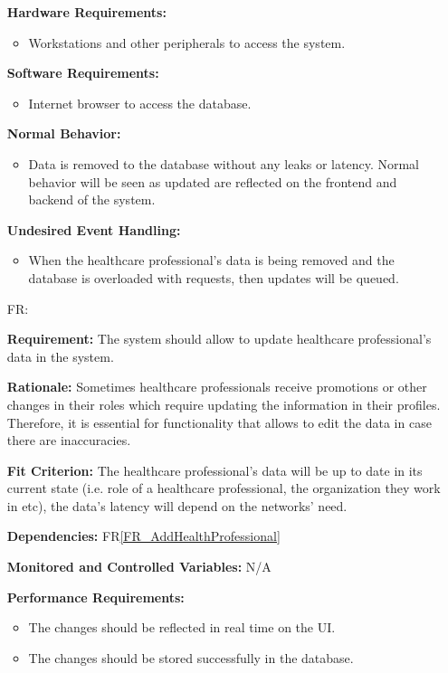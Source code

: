 \documentclass[12pt]{article}
\newcounter{reqnum} %
\begin{document}
\begin{itemize}
\textbf{Hardware Requirements:}
\begin{itemize}
  \item Workstations and other peripherals to access the system.
\end{itemize} 

\textbf{Software Requirements:}
\begin{itemize}
  \item Internet browser to access the database.
\end{itemize} 

\textbf{Normal Behavior:}
\begin{itemize}
  \item Data is removed to the database without any leaks or latency. Normal behavior will be seen as updated are reflected on the frontend and backend of the system.
\end{itemize} 

\textbf{Undesired Event Handling:}
\begin{itemize}
  \item When the healthcare professional’s data is being removed and the database is overloaded with requests, then updates will be queued.
\end{itemize} 

\item[FR\refstepcounter{reqnum}\thereqnum \label{FR_UpdateHealthProfessionals}:]

\textbf{Requirement:} The system should allow to update healthcare professional’s data in the system.

\textbf{Rationale:} Sometimes healthcare professionals receive promotions or other changes in their roles which require updating the information in their profiles. Therefore, it is essential for functionality that allows to edit the data in case there are inaccuracies.  

\textbf{Fit Criterion:} The healthcare professional’s data will be up to date in its current state (i.e. role of a healthcare professional, the organization they work in etc), the data’s latency will depend on the networks’ need. 

\textbf{Dependencies:} FR\ref{FR_AddHealthProfessional}

\textbf{Monitored and Controlled Variables:} N/A

\textbf{Performance Requirements:} 
\begin{itemize}
  \item The changes should be reflected in real time on the UI.
  \item The changes should be stored successfully in the database.
\end{itemize} 


\end{itemize}
\end{document}
